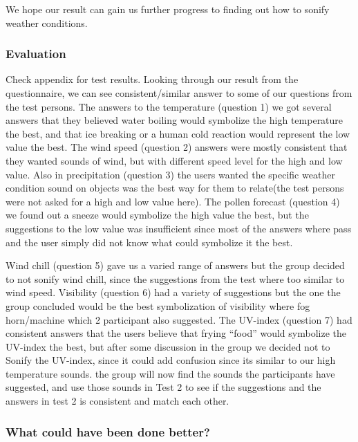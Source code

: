 We hope our result can gain us further progress to finding out how to sonify weather conditions.


\subsubsection*{Evaluation} %
\label{ssub:test_1_evaluation}

Check appendix for test results. 
Looking through our result from the questionnaire, we can see consistent/similar answer to some of our questions from the test persons. 
The answers to the temperature (question 1) we got several answers that they believed water boiling would symbolize the high temperature the best, and that ice breaking or a human cold reaction would represent the low value the best. 
The wind speed (question 2) answers were mostly consistent that they wanted sounds of wind, but with different speed level for the high and low value. 
Also in precipitation (question 3) the users wanted the specific weather condition sound on objects was the best way for them to relate(the test persons were not asked for a high and low value here). 
The pollen forecast (question 4) we found out a sneeze would symbolize the high value the best, but the suggestions to the low value was insufficient since most of the answers where pass and the user simply did not know what could symbolize it the best.

Wind chill (question 5) gave us a varied range of answers but the group decided to not sonify wind chill, since the suggestions from the test where too similar to wind speed. 
Visibility (question 6) had a variety of suggestions but the one the group concluded would be the best symbolization of visibility where fog horn/machine which 2 participant also suggested. 
The UV-index (question 7) had consistent answers that the users believe that frying ``food'' would symbolize the UV-index the best, but after some discussion in the group we decided not to Sonify the UV-index, since it could add confusion since its similar to our high temperature sounds. 
the group will now find the sounds the participants have suggested, and use those sounds in Test 2 to see if the suggestions and the answers in test 2 is consistent and match each other.


\subsubsection*{What could have been done better?} %
\label{ssub:test_1_what_could_have_been_done_better_}

